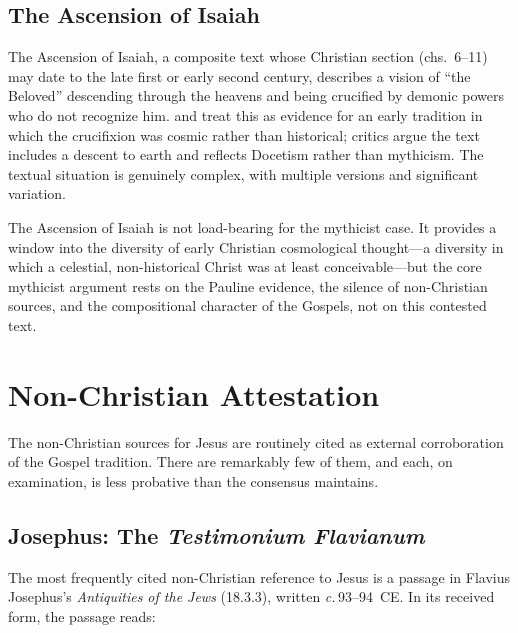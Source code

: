 \documentclass[12pt,oneside]{article}
\newcommand{\circa}{\textit{c.}\,}
\begin{document}
\subsection{The Ascension of Isaiah}
\label{sec:noncanon:ascension}

The Ascension of Isaiah, a composite text whose Christian section
(chs.~6--11) may date to the late first or early second century,
describes a vision of ``the Beloved'' descending through the heavens and
being crucified by demonic powers who do not recognize him.
\citet{Doherty2009} and \citet{Carrier2014} treat this as evidence for
an early tradition in which the crucifixion was cosmic rather than
historical; critics \citep{McGrath2014} argue the text includes a
descent to earth and reflects Docetism rather than mythicism.  The
textual situation is genuinely complex, with multiple versions and
significant variation.

The Ascension of Isaiah is not load-bearing for the mythicist case.  It
provides a window into the diversity of early Christian cosmological
thought---a diversity in which a celestial, non-historical Christ was at
least conceivable---but the core mythicist argument rests on the Pauline
evidence, the silence of non-Christian sources, and the compositional
character of the Gospels, not on this contested text.


\section{Non-Christian Attestation}
\label{sec:external}

The non-Christian sources for Jesus are routinely cited as external
corroboration of the Gospel tradition.  There are remarkably few of
them, and each, on examination, is less probative than the consensus
maintains.

\subsection{Josephus: The \textit{Testimonium Flavianum}}
\label{sec:external:tf}

The most frequently cited non-Christian reference to Jesus is a passage
in Flavius Josephus's \textit{Antiquities of the Jews} (18.3.3),
written \circa 93--94~CE.  In its received form, the passage reads:
\end{document}
